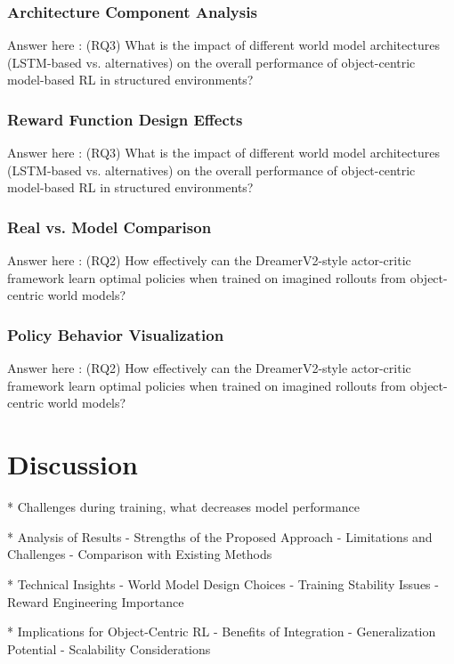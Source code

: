 \documentclass[
	english,
	ruledheaders=section,
	class=report,
	thesis={type=master},
	accentcolor=9c,
	custommargins=true,
	marginpar=false,
	parskip=half-,
	fontsize=11pt,
]{tudapub}
\begin{document}
\subsection{Architecture Component Analysis}
\label{subsec:architecture_analysis}
Answer here : (RQ3) What is the impact of different world model architectures (LSTM-based vs. alternatives) on the overall performance of object-centric model-based RL in structured environments?

\subsection{Reward Function Design Effects}
\label{subsec:reward_effects}
Answer here : (RQ3) What is the impact of different world model architectures (LSTM-based vs. alternatives) on the overall performance of object-centric model-based RL in structured environments?

\subsection{Real vs. Model Comparison}
\label{subsec:real_vs_model}
Answer here : (RQ2) How effectively can the DreamerV2-style actor-critic framework learn optimal policies when trained on imagined rollouts from object-centric world models?

\subsection{Policy Behavior Visualization}
\label{subsec:policy_visualization}
Answer here : (RQ2) How effectively can the DreamerV2-style actor-critic framework learn optimal policies when trained on imagined rollouts from object-centric world models?

\chapter{Discussion}
\label{chap:discussion}
* Challenges during training, what decreases model performance

* Analysis of Results
- Strengths of the Proposed Approach
- Limitations and Challenges
- Comparison with Existing Methods

* Technical Insights
- World Model Design Choices
- Training Stability Issues
- Reward Engineering Importance

* Implications for Object-Centric RL
- Benefits of Integration
- Generalization Potential
- Scalability Considerations
\end{document}
